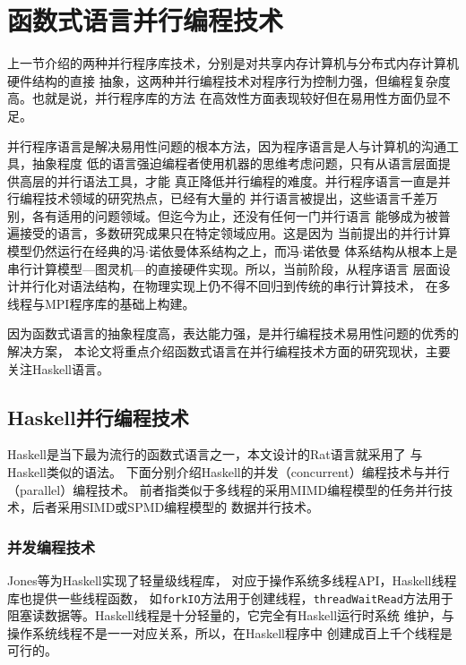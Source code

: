 \section{函数式语言并行编程技术}\label{sec:parallel-language}
上一节介绍的两种并行程序库技术，分别是对共享内存计算机与分布式内存计算机硬件结构的直接
抽象，这两种并行编程技术对程序行为控制力强，但编程复杂度高。也就是说，并行程序库的方法
在高效性方面表现较好但在易用性方面仍显不足。

并行程序语言是解决易用性问题的根本方法，因为程序语言是人与计算机的沟通工具，抽象程度
低的语言强迫编程者使用机器的思维考虑问题，只有从语言层面提供高层的并行语法工具，才能
真正降低并行编程的难度。并行程序语言一直是并行编程技术领域的研究热点，已经有大量的
并行语言被提出，这些语言千差万别，各有适用的问题领域。但迄今为止，还没有任何一门并行语言
能够成为被普遍接受的语言，多数研究成果只在特定领域应用。这是因为
当前提出的并行计算模型仍然运行在经典的冯$\cdot{}$诺依曼体系结构之上，而冯$\cdot{}$诺依曼
体系结构从根本上是串行计算模型---图灵机---的直接硬件实现。所以，当前阶段，从程序语言
层面设计并行化对语法结构，在物理实现上仍不得不回归到传统的串行计算技术，
在多线程与MPI程序库的基础上构建。

因为函数式语言的抽象程度高，表达能力强，是并行编程技术易用性问题的优秀的解决方案，
本论文将重点介绍函数式语言在并行编程技术方面的研究现状，主要关注Haskell语言。

\subsection{Haskell并行编程技术}
Haskell是当下最为流行的函数式语言之一，本文设计的Rat语言就采用了
与Haskell类似的语法。
下面分别介绍Haskell的并发（concurrent）编程技术与并行（parallel）编程技术。
前者指类似于多线程的采用MIMD编程模型的任务并行技术，后者采用SIMD或SPMD编程模型的
数据并行技术。

\subsubsection{并发编程技术}
Jones等为Haskell实现了轻量级线程库，
对应于操作系统多线程API，Haskell线程库也提供一些线程函数，
如\texttt{forkIO}方法用于创建线程，\texttt{threadWaitRead}方法用于
阻塞读数据等。Haskell线程是十分轻量的，它完全有Haskell运行时系统
维护，与操作系统线程不是一一对应关系，所以，在Haskell程序中
创建成百上千个线程是可行的。

